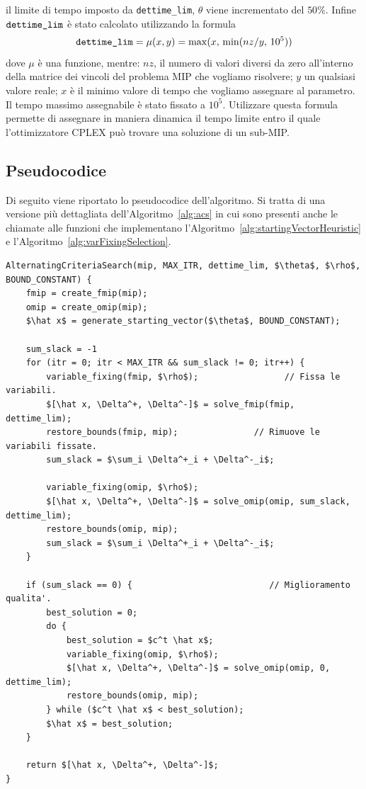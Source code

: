 il limite di tempo imposto da \verb|dettime_lim|, $\theta$ viene incrementato
del $50\%$.
Infine $\verb|dettime_lim|$ è stato calcolato utilizzando la formula
\begin{equation}
    \verb|dettime_lim| = \mu(x, y) = \max( x,\, \min( {nz}/{y}, \, 10^5))
\end{equation}
dove $\mu$ è una funzione, mentre: 
$nz$, il numero di valori diversi da zero all'interno della
matrice dei vincoli del problema MIP che vogliamo risolvere; $y$ un qualsiasi
valore reale;
$x$ è il minimo valore di tempo che vogliamo assegnare al parametro.
Il tempo massimo assegnabile è stato fissato a $10^5$.
Utilizzare questa formula permette di assegnare in maniera dinamica
il tempo limite entro il quale l'ottimizzatore CPLEX può trovare una soluzione
di un sub-MIP.

\subsection{Pseudocodice}%
\label{sub:Pseudocodice}
Di seguito viene riportato lo pseudocodice dell'algoritmo.
Si tratta di una versione più dettagliata dell'Algoritmo~\ref{alg:acs}
in cui sono presenti anche le chiamate alle funzioni che implementano
l'Algoritmo~\ref{alg:startingVectorHeuristic} e l'Algoritmo~\ref{alg:varFixingSelection}.

\begin{minipage}{\linewidth}
\begin{lstlisting}[mathescape=true]
AlternatingCriteriaSearch(mip, MAX_ITR, dettime_lim, $\theta$, $\rho$, BOUND_CONSTANT) {
    fmip = create_fmip(mip);
    omip = create_omip(mip);
    $\hat x$ = generate_starting_vector($\theta$, BOUND_CONSTANT);

    sum_slack = -1
    for (itr = 0; itr < MAX_ITR && sum_slack != 0; itr++) {
        variable_fixing(fmip, $\rho$);                 // Fissa le variabili.
        $[\hat x, \Delta^+, \Delta^-]$ = solve_fmip(fmip, dettime_lim);
        restore_bounds(fmip, mip);               // Rimuove le variabili fissate.
        sum_slack = $\sum_i \Delta^+_i + \Delta^-_i$;

        variable_fixing(omip, $\rho$);
        $[\hat x, \Delta^+, \Delta^-]$ = solve_omip(omip, sum_slack, dettime_lim);
        restore_bounds(omip, mip);
        sum_slack = $\sum_i \Delta^+_i + \Delta^-_i$;
    }

    if (sum_slack == 0) {                           // Miglioramento qualita'.
        best_solution = 0;
        do {
            best_solution = $c^t \hat x$;
            variable_fixing(omip, $\rho$);
            $[\hat x, \Delta^+, \Delta^-]$ = solve_omip(omip, 0, dettime_lim);
            restore_bounds(omip, mip);
        } while ($c^t \hat x$ < best_solution);
        $\hat x$ = best_solution;
    }
    
    return $[\hat x, \Delta^+, \Delta^-]$;
}
\end{lstlisting}
\end{minipage}

